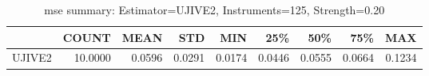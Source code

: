 \begin{table}[ht]
\centering
\caption{mse summary: Estimator=UJIVE2, Instruments=125, Strength=0.20}
\begin{tabular}{lrrrrrrrr}
\toprule
 & COUNT & MEAN & STD & MIN & 25\% & 50\% & 75\% & MAX \\
\midrule
UJIVE2 & 10.0000 & 0.0596 & 0.0291 & 0.0174 & 0.0446 & 0.0555 & 0.0664 & 0.1234 \\
\bottomrule
\end{tabular}
\end{table}
